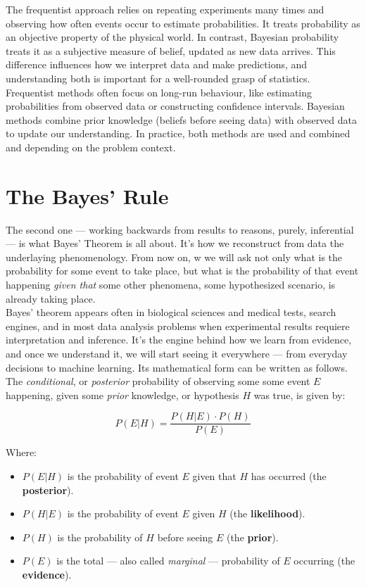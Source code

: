 \documentclass{book}
\begin{document}
The frequentist approach relies on repeating experiments many times and observing how often events occur to estimate probabilities. It treats probability as an objective property of the physical world. In contrast, Bayesian probability treats it as a subjective measure of belief, updated as new data arrives. This difference influences how we interpret data and make predictions, and understanding both is important for a well-rounded grasp of statistics.\\

Frequentist methods often focus on long-run behaviour, like estimating probabilities from observed data or constructing confidence intervals. Bayesian methods combine prior knowledge (beliefs before seeing data) with observed data to update our understanding. In practice, both methods are used and combined and depending on the problem context.\\

\newpage

\section{The Bayes' Rule}

The second one — working backwards from results to reasons, purely, inferential — is what Bayes’ Theorem is all about. It’s how we reconstruct from data the underlaying phenomenology. From now on, w we will ask not only what is the probability for some event to take place, but what is the probability of that event happening \textit{given that} some other phenomena, some hypothesized scenario, is already taking place.\\

Bayes’ theorem appears often in biological sciences and medical tests, search engines, and in most data analysis problems when experimental results requiere interpretation and inference. It’s the engine behind how we learn from evidence, and once we understand it, we will start seeing it everywhere — from everyday decisions to machine learning. Its mathematical form can be written as follows. The \textit{conditional}, or \textit{posterior} probability of observing some some event $E$ happening, given some \textit{prior} knowledge, or hypothesis $H$ was true, is given by:

\begin{equation}
P(E|H) = \frac{P(H|E) \cdot P(H)}{P(E)}
\end{equation}

Where:
\begin{itemize}
  \item $P(E|H)$ is the probability of event $E$ given that $H$ has occurred (the \textbf{posterior}).
  \item $P(H|E)$ is the probability of event $E$ given $H$ (the \textbf{likelihood}).
  \item $P(H)$ is the probability of $H$ before seeing $E$ (the \textbf{prior}).
  \item $P(E)$ is the total — also called \textit{marginal} — probability of $E$ occurring (the \textbf{evidence}).
\end{itemize}
\end{document}
